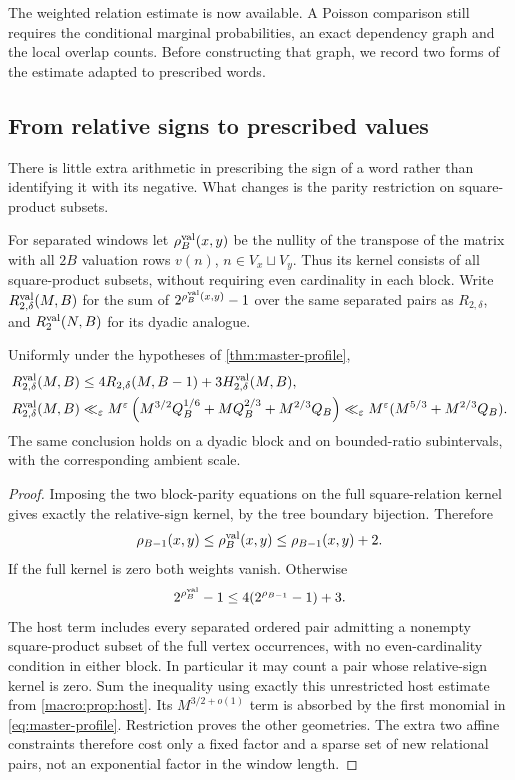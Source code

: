 The weighted relation estimate is now available. A Poisson comparison
still requires the conditional marginal probabilities, an exact dependency
graph and the local overlap counts. Before constructing that graph, we
record two forms of the estimate adapted to prescribed words.

\subsection{From relative signs to prescribed values}\label{sec:absolute-relations}
There is little extra arithmetic in prescribing the sign of a word rather
than identifying it with its negative. What changes is the parity
restriction on square-product subsets.

For separated windows let $\rho^{\rm val}_B(x,y)$ be the nullity of the
transpose of the matrix with all $2B$ valuation rows $v(n)$,
$n\in V_x\sqcup V_y$. Thus its kernel consists of all square-product
subsets, without requiring even cardinality in each block. Write
$R^{\rm val}_{2,\delta}(M,B)$ for the sum of
$2^{\rho^{\rm val}_B(x,y)}-1$ over the same separated pairs as $R_{2,\delta}$,
and $R^{\rm val}_2(N,B)$ for its dyadic analogue.

\begin{proposition}\label{prop:absolute-profile}
Uniformly under the hypotheses of \cref{thm:master-profile},
\begin{align}
 R^{\rm val}_{2,\delta}(M,B)
 &\le4R_{2,\delta}(M,B-1)+3H^{\rm val}_{2,\delta}(M,B),
       \label{eq:absolute-profile-comparison}\\
 R^{\rm val}_{2,\delta}(M,B)
 &\ll_\varepsilon M^\varepsilon
   \left(M^{3/2}Q_B^{1/6}+MQ_B^{2/3}+M^{2/3}Q_B\right)
 \ll_\varepsilon M^\varepsilon(M^{5/3}+M^{2/3}Q_B).
       \label{eq:absolute-profile}
\end{align}
The same conclusion holds on a dyadic block and on bounded-ratio
subintervals, with the corresponding ambient scale.
\end{proposition}
\begin{proof}
Imposing the two block-parity equations on the full square-relation
kernel gives exactly the relative-sign kernel, by the tree boundary
bijection. Therefore
\[
 \rho_{B-1}(x,y)\le\rho^{\rm val}_B(x,y)
                         \le\rho_{B-1}(x,y)+2.
\]
If the full kernel is zero both weights vanish. Otherwise
\[
 2^{\rho^{\rm val}_B}-1
 \le4(2^{\rho_{B-1}}-1)+3.
\]
The host term includes every separated ordered pair admitting a
nonempty square-product subset of the full vertex occurrences, with no
even-cardinality condition in either block. In particular it may count a
pair whose relative-sign kernel is zero. Sum the inequality using exactly
this unrestricted host estimate from \cref{macro:prop:host}. Its $M^{3/2+o(1)}$ term is absorbed by the first
monomial in \eqref{eq:master-profile}. Restriction proves the other
geometries. The extra two affine constraints therefore cost only a fixed
factor and a sparse set of new relational pairs, not an exponential
factor in the window length.
\end{proof}



